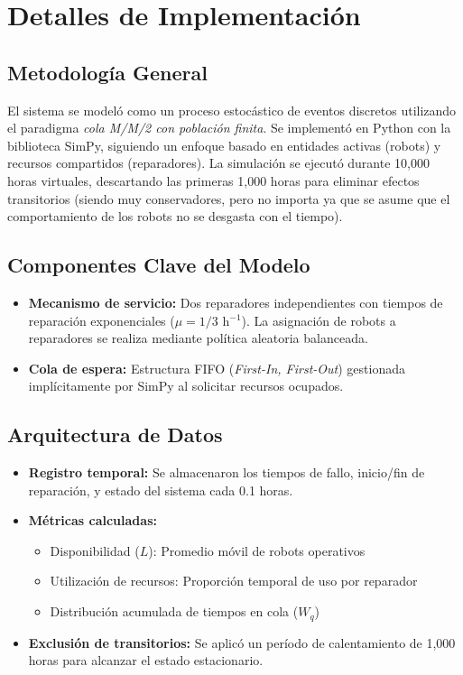 \documentclass[12pt, a4paper]{article}
\begin{document}
\section{Detalles de Implementación}

\subsection{Metodología General}
El sistema se modeló como un proceso estocástico de eventos discretos utilizando el paradigma \textit{cola M/M/2 con población finita}. Se implementó en Python con la biblioteca SimPy, siguiendo un enfoque basado en entidades activas (robots) y recursos compartidos (reparadores). La simulación se ejecutó durante 10,000 horas virtuales, descartando las primeras 1,000 horas para eliminar efectos transitorios (siendo muy conservadores, pero no importa ya que se asume que el comportamiento de los robots no se desgasta con el tiempo).

\subsection{Componentes Clave del Modelo}
\begin{itemize}
    \item \textbf{Mecanismo de servicio:} Dos reparadores independientes con tiempos de reparación exponenciales ($\mu = 1/3$ h$^{-1}$). La asignación de robots a reparadores se realiza mediante política aleatoria balanceada.
    
    \item \textbf{Cola de espera:} Estructura FIFO (\textit{First-In, First-Out}) gestionada implícitamente por SimPy al solicitar recursos ocupados.
\end{itemize}

\subsection{Arquitectura de Datos}
\begin{itemize}
    \item \textbf{Registro temporal:} Se almacenaron los tiempos de fallo, inicio/fin de reparación, y estado del sistema cada 0.1 horas.
    
    \item \textbf{Métricas calculadas:} 
    \begin{itemize}
        \item Disponibilidad ($L$): Promedio móvil de robots operativos
        \item Utilización de recursos: Proporción temporal de uso por reparador
        \item Distribución acumulada de tiempos en cola ($W_q$)
    \end{itemize}
    \item \textbf{Exclusión de transitorios:} Se aplicó un período de calentamiento de 1,000 horas para alcanzar el estado estacionario.
\end{itemize}
\end{document}
